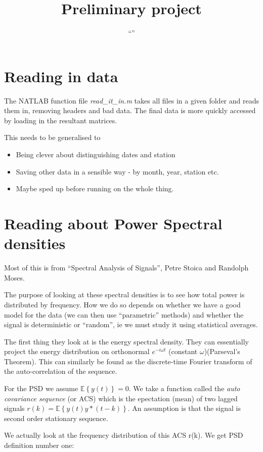 \documentclass[11pt]{article}
\title{Preliminary project}
\author{``''}
\begin{document}
\maketitle

\section{Reading in data}
The NATLAB function file \emph{read\_it\_in.m} takes all files in a given folder and reads them
in, removing headers and bad data. The final data is more  quickly accessed by loading in the
resultant matrices.

This needs to be generalised to 
\begin{itemize}
    \item Being clever about distinguishing dates and station
    \item Saving other data in a sensible way - by month, year, station etc.
    \item Maybe sped up before running on the whole thing.
\end{itemize}

\section{Reading about Power Spectral densities}
Most of this is from ``Spectral Analysis of Signals'', Petre Stoica and Randolph Moses. 

The purpose of looking at these spectral densities is to see how total power is distributed by
frequency. How we do so depends on whether we have a good model for the data (we can then use
``parametric'' methods) and whether the signal is deterministic or ``random'', ie we must
study it using statistical averages.

The first thing they look at is the energy spectral density. They can essentially project the
energy distribution on orthonormal $e^{-i \omega t}$ (constant $\omega$)(Parseval's
Theorem). This can similarly be found as the discrete-time Fourier transform of the
auto-correlation of the sequence.

For the PSD we {\color{red} assume $\mathbb{E} \left\{ y(t) \right\} = 0$}. We take a function called
the \emph{auto covariance sequence} (or ACS) which is the epectation (mean) of two lagged signals
$r(k) = \mathbb{E} \left\{ y(t) y*(t-k) \right\}$. An assumption is that {\color{red} the signal
is second order stationary sequence}.

We actually look at the frequency distribution of this ACS r(k). We get PSD definition number one:
\end{document}
